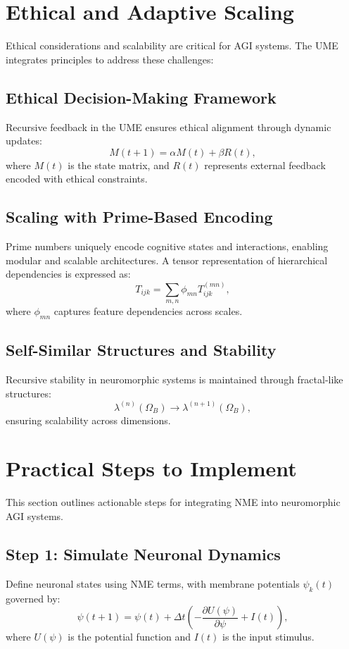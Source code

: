 \documentclass{article}
\theoremstyle{plain}
\begin{document}
\section{Ethical and Adaptive Scaling}
Ethical considerations and scalability are critical for AGI systems. The UME integrates principles to address these challenges:
\subsection{Ethical Decision-Making Framework}
Recursive feedback in the UME ensures ethical alignment through dynamic updates:
\begin{equation}
M(t+1) = \alpha M(t) + \beta R(t),
\end{equation}
where $M(t)$ is the state matrix, and $R(t)$ represents external feedback encoded with ethical constraints.

\subsection{Scaling with Prime-Based Encoding}
Prime numbers uniquely encode cognitive states and interactions, enabling modular and scalable architectures. A tensor representation of hierarchical dependencies is expressed as:
\begin{equation}
T_{ijk} = \sum_{m,n} \phi_{mn} T_{ijk}^{(mn)},
\end{equation}
where $\phi_{mn}$ captures feature dependencies across scales.

\subsection{Self-Similar Structures and Stability}
Recursive stability in neuromorphic systems is maintained through fractal-like structures:
\begin{equation}
\lambda^{(n)}(\Omega_B) \to \lambda^{(n+1)}(\Omega_B),
\end{equation}
ensuring scalability across dimensions.

\section{Practical Steps to Implement}
This section outlines actionable steps for integrating NME into neuromorphic AGI systems.
\subsection{Step 1: Simulate Neuronal Dynamics}
Define neuronal states using NME terms, with membrane potentials $\psi_k(t)$ governed by:
\begin{equation}
\psi(t+1) = \psi(t) + \Delta t \left(-\frac{\partial U(\psi)}{\partial \psi} + I(t)\right),
\end{equation}
where $U(\psi)$ is the potential function and $I(t)$ is the input stimulus.
\end{document}
